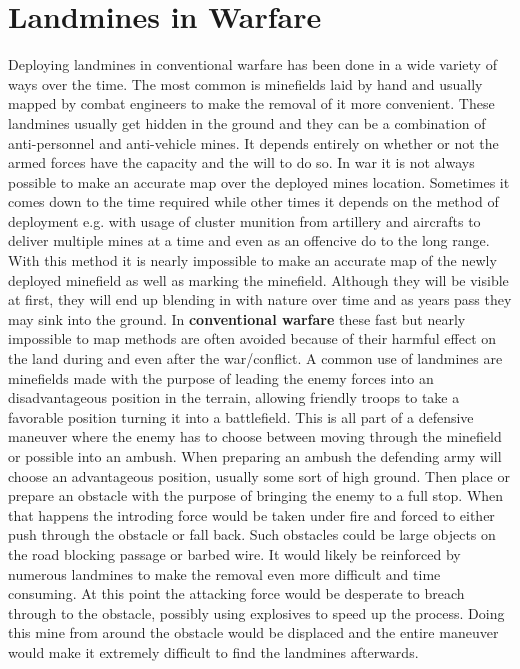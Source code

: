 \section{Landmines in Warfare}

Deploying landmines in conventional warfare has been done in a wide variety of ways over the time. The most common is minefields laid by hand and usually mapped by combat engineers to make the removal of it more convenient. These landmines usually get hidden in the ground and they can be a combination of anti-personnel and anti-vehicle mines. It depends entirely on whether or not the armed forces have the capacity and the will to do so. In war it is not always possible to make an accurate map over the deployed mines location. Sometimes it comes down to the time required while other times it depends on the method of deployment e.g. with usage of cluster munition from artillery and aircrafts to deliver multiple mines at a time and even as an offencive do to the long range. With this method it is nearly impossible to make an accurate map of the newly deployed minefield as well as marking the minefield. Although they will be visible at first, they will end up blending in with nature over time and as years pass they may sink into the ground. In \textbf{conventional warfare} these fast but nearly impossible to map methods are often avoided because of their harmful effect on the land during and even after the war/conflict. A common use of landmines are minefields made with the purpose of leading the enemy forces into an disadvantageous position in the terrain, allowing friendly troops to take a favorable position turning it into a battlefield. This is all part of a defensive maneuver where the enemy has to choose between moving through the minefield or possible into an ambush. When preparing an ambush the defending army will choose an advantageous position, usually some sort of high ground. Then place or prepare an obstacle with the purpose of bringing the enemy to a full stop. When that happens the introding force would be taken under fire and forced to either push through the obstacle or fall back. Such obstacles could be large objects on the road blocking passage or barbed wire. It would likely be reinforced by numerous landmines to make the removal even more difficult and time consuming. At this point the attacking force would be desperate to breach through to the obstacle, possibly using explosives to speed up the process. Doing this mine from around the obstacle would be displaced and the entire maneuver would make it extremely difficult to find the landmines afterwards.

